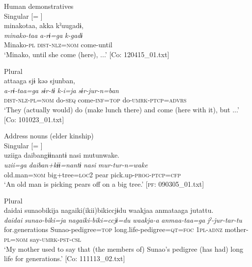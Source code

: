   Human demonstratives\\

\ex  Singular [= ]\\

{\TM}
\glll minakotaa,  akka  kˀuugadɨ,\\
      \textit{minako-taa}  \textit{a-rɨ=ga}  \textit{k-gadɨ}\\
      Minako-\textsc{pl}  \textsc{dist}-\textsc{nlz}=\textsc{nom}  come-until\\
\glt ‘Minako, until she come (here), ...’ [Co: 120415\_01.txt]

\ex  Plural\\

{\TM}
\glll attaaga  sjɨ  kəə  sjunban,\\
      \textit{a-rɨ-taa=ga}  \textit{sɨr-tɨ}  \textit{k-i=ja}  \textit{sɨr-jur-n=ban}\\
      \textsc{dist}-\textsc{nlz}-\textsc{pl}=\textsc{nom}  do-\textsc{seq}  come-\textsc{inf}=\textsc{top}  do-\textsc{umrk}-\textsc{ptcp}=\textsc{advrs}\\
\glt ‘They (actually would) do (make lunch there) and come (here with it), but ...’ [Co: 101023\_01.txt]


  Address nouns (elder kinship)\\

\ex  Singular [= ]\\

{\TM}
\glll uziiga  daibangɨɨnantɨ  nasi  mutunwake.\\
      \textit{uzii=ga}  \textit{daiban+kɨɨ=nantɨ}  \textit{nasi}  \textit{mur-tur-n=wake}\\
      old.man=\textsc{nom}  big+tree=\textsc{loc2}  pear  pick.up-\textsc{prog}-\textsc{ptcp}=\textsc{cfp}\\
\glt ‘An old man is picking pears off on a big tree.’ [\textsc{pf}: 090305\_01.txt]

\ex  Plural\\

{\TM}
\glll daidai  sunaobikija  nagaiki(ikii)bikiccjɨdu    waakjaa  anmataaga  jutattu.\\
      \textit{daidai}  \textit{sunao-biki=ja}  \textit{nagaiki-biki=ccjɨ=du}   \textit{waakja-a}  \textit{anmaa-taa=ga}  \textit{jˀ-jur-tar-tu}\\
      for.generations  Sunao-pedigree=\textsc{top}  long.life-pedigree=\textsc{qt}=\textsc{foc}      1\textsc{pl}-\textsc{adnz}  mother-\textsc{pl}=\textsc{nom}  say-\textsc{umrk}-\textsc{pst}-\textsc{csl}\\
\glt ‘My mother used to say that (the members of) Sunao’s pedigree (has had) long life for generations.’ [Co: 111113\_02.txt]


